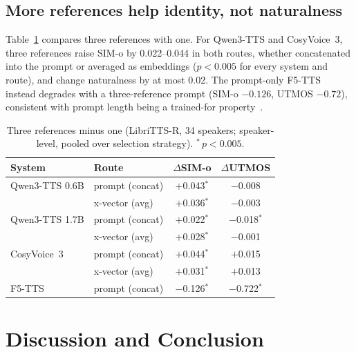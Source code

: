 \documentclass{Interspeech}
\begin{document}
\subsection{More references help identity, not naturalness}
\label{sec:refcount}

Table~\ref{tab:refcount} compares three references with one.
For Qwen3-TTS and CosyVoice~3, three references raise SIM-o by 0.022--0.044 in both routes, whether concatenated into the prompt or averaged as embeddings ($p{<}0.005$ for every system and route), and change naturalness by at most 0.02.
The prompt-only F5-TTS instead degrades with a three-reference prompt (SIM-o $-0.126$, UTMOS $-0.72$), consistent with prompt length being a trained-for property~\cite{megatts2}.

\begin{table}[t]
\centering
\caption{Three references minus one (LibriTTS-R, 34 speakers; speaker-level, pooled over selection strategy). $^\ast$\,$p{<}0.005$.}
\label{tab:refcount}
\small
\setlength{\tabcolsep}{4pt}
\begin{tabular}{llcc}
\toprule
\textbf{System} & \textbf{Route} & $\Delta$\textbf{SIM-o} & $\Delta$\textbf{UTMOS} \\
\midrule
Qwen3-TTS 0.6B & prompt (concat) & $+$0.043$^\ast$ & $-$0.008 \\
               & x-vector (avg)  & $+$0.036$^\ast$ & $-$0.003 \\
Qwen3-TTS 1.7B & prompt (concat) & $+$0.022$^\ast$ & $-$0.018$^\ast$ \\
               & x-vector (avg)  & $+$0.028$^\ast$ & $-$0.001 \\
CosyVoice~3    & prompt (concat) & $+$0.044$^\ast$ & $+$0.015 \\
               & x-vector (avg)  & $+$0.031$^\ast$ & $+$0.013 \\
F5-TTS         & prompt (concat) & $-$0.126$^\ast$ & $-$0.722$^\ast$ \\
\bottomrule
\end{tabular}
\end{table}

\section{Discussion and Conclusion}
\label{sec:conclusion}
\end{document}
